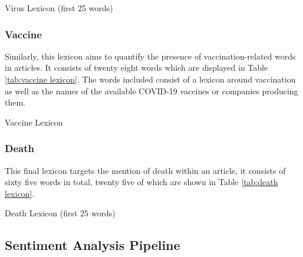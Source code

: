 \begin{table}[htb]
\caption{Virus Lexicon (first 25 words)}
\label{tab:virus lexicon}
\centering
{}
\end{table}

\subsubsection{Vaccine}

Similarly, this lexicon aims to quantify the presence of vaccination-related words in articles. It consists of twenty eight words which are displayed in Table \ref{tab:vaccine lexicon}. The words included consist of a lexicon around vaccination as well as the names of the available COVID-19 vaccines or companies producing them.

\begin{table}[htb]
\caption{Vaccine Lexicon}
\label{tab:vaccine lexicon}
\centering
{}
\end{table}

\subsubsection{Death}

This final lexicon targets the mention of death within an article, it consists of sixty five words in total, twenty five of which are shown in Table \ref{tab:death lexicon}.

\begin{table}[htb]
\caption{Death Lexicon (first 25 words)}
\label{tab:death lexicon}
\centering
{}
\end{table}

\subsection{Sentiment Analysis Pipeline}

